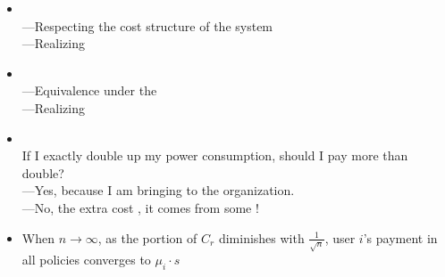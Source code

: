 \documentclass[a0,portrait]{a0poster}
\begin{document}
\begin{multicols}{2}
\begin{itemize}
---

\item {}
 \\
---Respecting the cost structure of the system \\
---Realizing  \\

\item {} 
 \\
---Equivalence under the  \\
---Realizing 

\item {} \\
If I exactly double up my power consumption, should I pay more than double? \\
---Yes, because I am bringing  to the organization. \\
---No, the extra cost , it comes from some !

\item {When $n\to\infty$}, as the portion of $C_r$ diminishes with $\frac{1}{\sqrt{n}}$, user $i$'s payment in all policies converges to $\mu_i\cdot s$ \\


\end{itemize}



\end{multicols}
\end{document}

